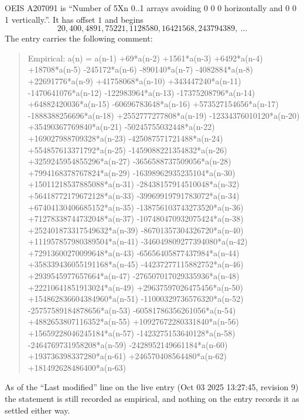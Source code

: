 \documentclass[11pt,a4paper]{article}
\theoremstyle{plain}
\theoremstyle{definition}
\begin{document}
OEIS A207091 is ``Number of 5Xn 0..1 arrays avoiding 0 0 0 horizontally and 0 0 1 vertically.''. It has offset
$1$ and begins
\[
20, 400, 4891, 75221, 1128580, 16421568, 243794389,\ \dots
\]
The entry carries the following comment:
\begin{quote}\small
Empirical: a(n) = a(n-1) +69*a(n-2) +1561*a(n-3) +6492*a(n-4) +18708*a(n-5) -245172*a(n-6) -890140*a(n-7) -4082884*a(n-8) +22691776*a(n-9) +41758068*a(n-10) +343447240*a(n-11) -1470641076*a(n-12) -122983964*a(n-13) -17375208796*a(n-14) +64882420036*a(n-15) -60696783648*a(n-16) +573527154656*a(n-17) -1888388256696*a(n-18) +2552777277808*a(n-19) -12334376010120*a(n-20) +35490367769840*a(n-21) -50245755032448*a(n-22) +169027988709328*a(n-23) -425087571721488*a(n-24) +554857613371792*a(n-25) -1459088221354832*a(n-26) +3259245954855296*a(n-27) -3656588737509056*a(n-28) +7994168378767824*a(n-29) -16398962935235104*a(n-30) +15011218537885088*a(n-31) -28438157914510048*a(n-32) +56418772179672128*a(n-33) -39969919791783072*a(n-34) +67404130406685152*a(n-35) -138756103743273520*a(n-36) +71278338744732048*a(n-37) -107480470932075424*a(n-38) +252401873317549632*a(n-39) -86701357304326720*a(n-40) +111957857980389504*a(n-41) -346049809277394080*a(n-42) +72913600270099648*a(n-43) -65656405877437984*a(n-44) +358339436055191168*a(n-45) -44237277115882752*a(n-46) +2939545977657664*a(n-47) -276507017029335936*a(n-48) +22210641851913024*a(n-49) +29637597026475456*a(n-50) +154862836604384960*a(n-51) -11000329736576320*a(n-52) -25757589184878656*a(n-53) -60581786356261056*a(n-54) +4882653807116352*a(n-55) +10927672280331840*a(n-56) +15659228046245184*a(n-57) -1423275153640128*a(n-58) -2464769731958208*a(n-59) -2428952149661184*a(n-60) +193736398337280*a(n-61) +246570408564480*a(n-62) +181492628486400*a(n-63)
\end{quote}
As of the ``Last modified'' line on the live entry (Oct 03 2025 13:27:45, revision
9) the statement is still recorded as empirical, and nothing on the entry
records it as settled either way.
\end{document}

